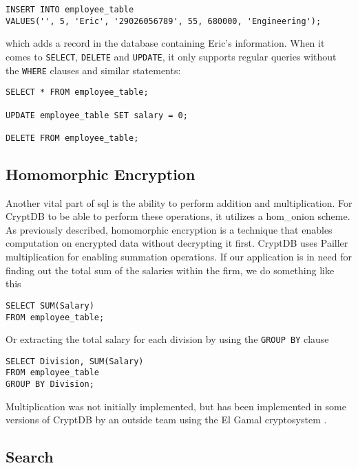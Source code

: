 \begin{verbatim}
INSERT INTO employee_table
VALUES('', 5, 'Eric', '29026056789', 55, 680000, 'Engineering');
\end{verbatim}

\noindent
which adds a record in the database containing Eric's information. When it comes to \verb!SELECT!, \verb!DELETE! and \verb!UPDATE!, it only supports regular queries without the \verb!WHERE! clauses and similar statements:

\begin{verbatim}
SELECT * FROM employee_table;

UPDATE employee_table SET salary = 0;

DELETE FROM employee_table;
\end{verbatim}



\subsection{Homomorphic Encryption}

Another vital part of \Gls{sql} is the ability to perform addition and multiplication. For CryptDB to be able to perform these operations, it utilizes a \Gls{hom_onion} scheme. As previously described, homomorphic encryption is a technique that enables computation on encrypted data without decrypting it first. CryptDB uses Pailler multiplication \cite{Paillier} for enabling summation operations. If our application is in need for finding out the total sum of the salaries within the firm, we do something like this

\begin{verbatim}
SELECT SUM(Salary)
FROM employee_table;
\end{verbatim}

\noindent
Or extracting the total salary for each division by using the \verb!GROUP BY! clause

\begin{verbatim}
SELECT Division, SUM(Salary)
FROM employee_table
GROUP BY Division;
\end{verbatim}

\noindent
Multiplication was not initially implemented, but has been implemented in some versions of CryptDB by an outside team using the El Gamal cryptosystem \cite{cryptdb_guidelines}. 



\subsection{Search}

